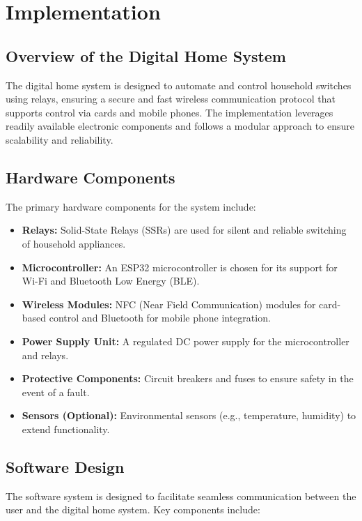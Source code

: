 \section{Implementation}\label{sec:implementation}

\subsection*{Overview of the Digital Home System}
The digital home system is designed to automate and control household switches using relays, ensuring a secure and fast wireless communication protocol that supports control via cards and mobile phones. The implementation leverages readily available electronic components and follows a modular approach to ensure scalability and reliability.

\subsection*{Hardware Components}
The primary hardware components for the system include:

\begin{itemize}
	\item \textbf{Relays:} Solid-State Relays (SSRs) are used for silent and reliable switching of household appliances.
	\item \textbf{Microcontroller:} An ESP32 microcontroller is chosen for its support for Wi-Fi and Bluetooth Low Energy (BLE).
	\item \textbf{Wireless Modules:} NFC (Near Field Communication) modules for card-based control and Bluetooth for mobile phone integration.
	\item \textbf{Power Supply Unit:} A regulated DC power supply for the microcontroller and relays.
	\item \textbf{Protective Components:} Circuit breakers and fuses to ensure safety in the event of a fault.
	\item \textbf{Sensors (Optional):} Environmental sensors (e.g., temperature, humidity) to extend functionality.
\end{itemize}

\subsection*{Software Design}
The software system is designed to facilitate seamless communication between the user and the digital home system. Key components include:


